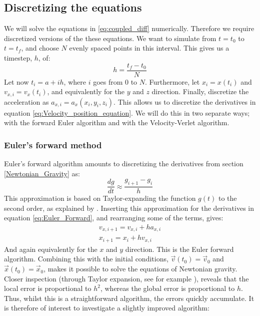 \documentclass[a4paper, 10pt]{article}
\begin{document}
\subsection{Discretizing the equations}\label{discretize_equations}
We will solve the equations in \ref{eq:coupled_diff} numerically. Therefore we require discretized versions of the these equations. We want to simulate from $t=t_0$ to $t=t_f$, and choose $N$ evenly spaced points in this interval. This gives us a timestep, $h$, of:
$$h=\frac{t_f-t_0}{N}$$
Let now $t_i=a+ih$, where $i$ goes from $0$ to $N$. Furthermore, let $x_i=x(t_i)$ and $ v_{x,i}=v_x(t_i)$, and equivalently for the $y$ and $z$ direction. Finally, discretize the acceleration as $a_{x,i}=a_x(x_i, y_i, z_i)$. This allows us to discretize the derivatives in equation \ref{eq:Velocity_position_equation}. We will do this in two separate ways; with the forward Euler algorithm and with the Velocity-Verlet algorithm.
\subsubsection{Euler's forward method}
Euler's forward algorithm amounts to discretizing the derivatives from section \ref{Newtonian_Gravity} as:
\begin{equation}\label{eq:Euler_Forward}
\frac{dg}{dt}\approx \frac{g_{i+1}-g_i}{h}
\end{equation}
This approximation is based on Taylor-expanding the function $g(t)$ to the second order, as explained by \cite{Forward_Euler}. Inserting this approximation for the derivatives in equation \ref{eq:Euler_Forward}, and rearranging some of the terms, gives:
\begin{equation}
\begin{split}
v_{x, i+1}=v_{x,i}+ha_{x,i}\\
x_{i+1}=x_i+hv_{x,i}
\end{split}
\end{equation}
And again equivalently for the $x$ and $y$ direction. This is the Euler forward algorithm. Combining this with the initial conditions, $\vec{v}(t_0)=\vec{v}_0$ and $\vec{x}(t_0)=\vec{x}_0$, makes it possible to solve the equations of Newtonian gravity. Closer inspection (through Taylor expansion, see for example \cite{Error_Euler}), reveals that the local error is proportional to $h^2$, whereas the global error is proportional to $h$. Thus, whilst this is a straightforward algorithm, the errors quickly accumulate. It is therefore of interest to investigate a slightly improved algorithm:
\end{document}
